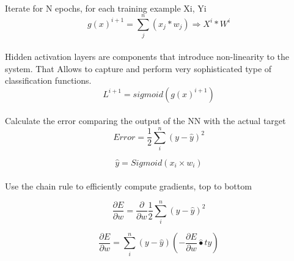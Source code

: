 \documentclass{llncs}       %
\begin{document}
\paragraph{}Iterate for N epochs,  for each training example Xi, Yi 
\begin{equation} 
g(x)^{i+1}=\sum_j^n(x_{j}*w_{j})\Rightarrow X^{i}*W^{i}
\end{equation}

\paragraph{}
Hidden activation layers are components that introduce non-linearity to 
the system. That Allows to capture and perform very sophisticated type 
of classification functions.
\begin{equation} 
L^{i+1}=sigmoid(g(x)^{i+1})
\end{equation}

\paragraph{}
\paragraph{}Calculate the error comparing the output of the NN with the actual target 
\begin{equation} 
Error = \frac{1}{2}\sum_i^n( y -\widehat{y})^2
\end{equation}

\begin{equation} 
\widehat{y}=Sigmoid(x_{i}\times w_{i})
\end{equation}

\paragraph{}
\paragraph{} Use the chain rule to efficiently compute gradients, top to bottom

\begin{equation} 
\frac{\partial E}{\partial w}=\frac{\partial }{\partial w} \frac{1}{2}\sum_i^n( y -\widehat{y})^2
\end{equation}

\begin{equation} 
\frac{\partial E}{\partial w} = \sum_i^n ( y -\widehat{y})  (-\frac{\partial E}{\partial w}\widehat{•}t{y})
\end{equation}
\end{document}
